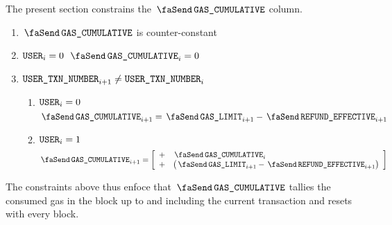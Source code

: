 The present section constrains the $\txCumulativeConsumedGas$ column. 
\begin{enumerate}
	\item $\txCumulativeConsumedGas$ is counter-constant
	\item \If $\texttt{USER} _{i} = 0$ \Then $\txCumulativeConsumedGas _{i} = 0$
	\item \If $\texttt{USER}\texttt{\_}\texttt{TXN\_NUMBER} _{i + 1} \neq \texttt{USER}\texttt{\_}\texttt{TXN\_NUMBER} _{i}$ \Then
		\begin{enumerate}
			\item \If $\texttt{USER} _{i} = 0$ \Then
				\[
					\txCumulativeConsumedGas_{i + 1} = \txGasLimit_{i + 1} - \txEffectiveRefund_{i + 1}
				\]
			\item \If $\texttt{USER} _{i} = 1$ \Then
		\[
			\txCumulativeConsumedGas_{i + 1} 
			=
			\left[ \begin{array}{ll}
				+ & \txCumulativeConsumedGas_{i}                           \\
				+ & \big(\txGasLimit_{i + 1} - \txEffectiveRefund_{i + 1}\big) \\
			\end{array}\right]
		\]
		\end{enumerate}
\end{enumerate}
The constraints above thus enfoce that $\txCumulativeConsumedGas$ tallies the consumed gas in the block up to and including the current transaction and resets with every block.
